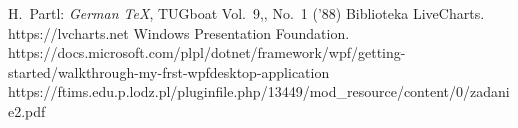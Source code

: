 \documentclass[12pt]{article}
\begin{document}

\begin{thebibliography}{99}
 H.~Partl:
\emph{German \TeX},
TUGboat Vol.~9,, No.~1 ('88)
 Biblioteka LiveCharts. https://lvcharts.net
 Windows Presentation Foundation. https://docs.microsoft.com/plpl/dotnet/framework/wpf/getting-started/walkthrough-my-frst-wpfdesktop-application
 https://ftims.edu.p.lodz.pl/pluginfile.php/13449/mod\_resource/content/0/zadanie2.pdf
\end{thebibliography}
\end{document}
